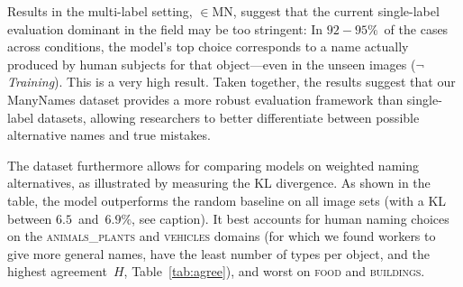 Results in the multi-label setting, $\in$MN, suggest that the current single-label evaluation dominant in the field may be too stringent: In \mbox{$92-95\%$}\ of the cases across conditions, the model's top choice corresponds to a name actually produced by human subjects for that object---even in the unseen images (\mbox{$\neg$\textit{Training}}).
This is a very high result.
Taken together, the results suggest that our ManyNames dataset provides a more robust evaluation framework than single-label datasets, allowing researchers to better differentiate between possible alternative names and true mistakes.

The dataset furthermore allows for comparing models on weighted naming alternatives, as illustrated by measuring the KL divergence. 
As shown in the table, the model outperforms the random baseline on all image sets (with a KL between \mbox{$6.5$ and $6.9\%$}, see caption). 
It best accounts for human naming choices on the \textsc{animals\_plants} and \textsc{vehicles} domains (for which we found workers to give more general names, have the least number of types per object, and the highest agreement\ $H$, Table\ \ref{tab:agree}), and worst on \textsc{food} and \textsc{buildings}. %


